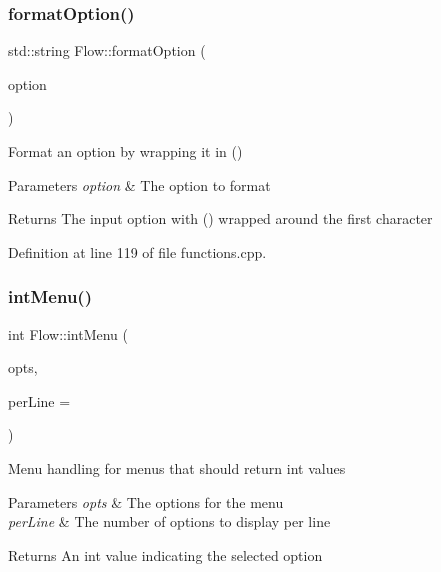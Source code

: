 \hypertarget{namespace_flow_ab6fa41130934e9e1394a8954927dc599}{}\label{namespace_flow_ab6fa41130934e9e1394a8954927dc599} 
\subsubsection{\texorpdfstring{format\+Option()}{formatOption()}\hspace{0.1cm}{\footnotesize\ttfamily [2/2]}}
{\footnotesize\ttfamily std\+::string Flow\+::format\+Option (\begin{DoxyParamCaption}\item[{const std\+::string \&}]{option }\end{DoxyParamCaption})}

Format an option by wrapping it in () 
\begin{DoxyParams}{Parameters}
{\em option} & The option to format \\
\hline
\end{DoxyParams}
\begin{DoxyReturn}{Returns}
The input option with () wrapped around the first character 
\end{DoxyReturn}


Definition at line 119 of file functions.\+cpp.

\hypertarget{namespace_flow_af997fd944ca97b653f33cc9889a5e1a2}{}\label{namespace_flow_af997fd944ca97b653f33cc9889a5e1a2} 
\subsubsection{\texorpdfstring{int\+Menu()}{intMenu()}}
{\footnotesize\ttfamily int Flow\+::int\+Menu (\begin{DoxyParamCaption}\item[{const \hyperlink{class_collections_1_1_linked_list}{Collections\+::\+Linked\+List}$<$ std\+::string $>$ \&}]{opts,  }\item[{int}]{per\+Line = {} }\end{DoxyParamCaption})}

Menu handling for menus that should return int values 
\begin{DoxyParams}{Parameters}
{\em opts} & The options for the menu \\
\hline
{\em per\+Line} & The number of options to display per line \\
\hline
\end{DoxyParams}
\begin{DoxyReturn}{Returns}
An int value indicating the selected option 
\end{DoxyReturn}


